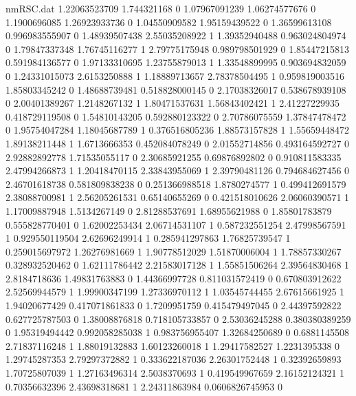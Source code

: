 \begin{filecontents}{nmRSC.dat}
1.22063523709 1.744321168 0
1.07967091239 1.06274577676 0
1.1900696085 1.26923933736 0
1.04550909582 1.95159439522 0
1.36599613108 0.996983555907 0
1.48939507438 2.55035208922 1
1.39352940488 0.963024804974 0
1.79847337348 1.76745116277 1
2.79775175948 0.989798501929 0
1.85447215813 0.591984136577 0
1.97133310695 1.23755879013 1
1.33548899995 0.903694832059 0
1.24331015073 2.6153250888 1
1.18889713657 2.78378504495 1
0.959819003516 1.85803345242 0
1.48688739481 0.518828000145 0
2.17038326017 0.538678939108 0
2.00401389267 1.2148267132 1
1.80471537631 1.56843402421 1
2.41227229935 0.418729119508 0
1.54810143205 0.592880123322 0
2.70786075559 1.37847478472 0
1.95754047284 1.18045687789 1
0.376516805236 1.88573157828 1
1.55659448472 1.89138211448 1
1.6713666353 0.452084078249 0
2.01552714856 0.493164592727 0
2.92882892778 1.71535055117 0
2.30685921255 0.69876892802 0
0.910811583335 2.47994266873 1
1.20418470115 2.33843955069 1
2.39790481126 0.794684627456 0
2.46701618738 0.581809838238 0
0.251366988518 1.8780274577 1
0.499412691579 2.38088700981 1
2.56205261531 0.65140655269 0
0.421518010626 2.06060390571 1
1.17009887948 1.5134267149 0
2.81288537691 1.68955621988 0
1.85801783879 0.555828770401 0
1.62002253434 2.06714531107 1
0.587232551254 2.47998567591 1
0.929550119504 2.62696249914 1
0.285941297863 1.76825739547 1
0.259015697972 1.26276981669 1
1.90778512029 1.51870006004 1
1.78857330267 0.328932520462 0
1.62111786442 2.21583017128 1
1.55851506264 2.39564830468 1
2.8184718636 1.49831763883 0
1.44366997728 0.811031572419 0
0.670803912622 2.52569944579 1
1.99900347199 1.27336970112 1
1.03545744455 2.67615661925 1
1.94020677429 0.417071861833 0
1.7209951759 0.415479497045 0
2.44397592822 0.627725787503 0
1.38008876818 0.718105733857 0
2.53036245288 0.380380389259 0
1.95319494442 0.992058285038 1
0.983756955407 1.32684250689 0
0.6881145508 2.71837116248 1
1.88019132883 1.60123260018 1
1.29417582527 1.2231395338 0
1.29745287353 2.79297372882 1
0.333622187036 2.26301752448 1
0.32392659893 1.70725807039 1
1.27163496314 2.5038370693 1
0.419549967659 2.16152124321 1
0.70356632396 2.43698318681 1
2.24311863984 0.0606826745953 0
\end{filecontents}
